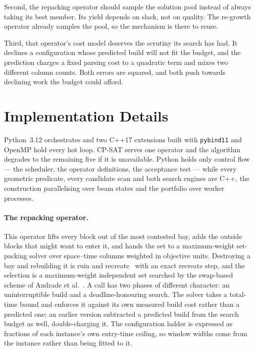 \documentclass[runningheads]{llncs}
\begin{document}
Second, the repacking operator should sample the solution pool instead of always taking its best
member. Its yield depends on slack, not on quality. The re-growth operator already samples the
pool, so the mechanism is there to reuse.

Third, that operator's cost model deserves the scrutiny its search has had. It declines a
configuration whose predicted build will not fit the budget, and the prediction charges a fixed
parsing cost to a quadratic term and mixes two different column counts. Both errors are squared,
and both push towards declining work the budget could afford.

\section{Implementation Details}
\label{sec:implementation}

Python~3.12 orchestrates and two C++17 extensions built with \texttt{pybind11} and OpenMP hold
every hot loop. CP-SAT serves one operator and the algorithm degrades to the remaining five if it
is unavailable. Python holds only control flow --- the scheduler, the operator definitions, the
acceptance test --- while every geometric predicate, every candidate scan and both search engines
are C++, the construction parallelising over beam states and the portfolio over worker processes.

\paragraph{The repacking operator.}
\label{sec:repack}
This operator lifts every block out of the most contested bay, adds the outside blocks that might
want to enter it, and hands the set to a maximum-weight set-packing solver over space--time columns
weighted in objective units. Destroying a bay and rebuilding it is ruin and
recreate~\cite{schrimpf2000} with an exact recreate step, and the selection is a maximum-weight
independent set searched by the swap-based scheme of Andrade et al.~\cite{andrade2012}. A call has
two phases of different character: an uninterruptible build and a deadline-honouring search. The
solver takes a total-time bound and enforces it against its own measured build cost rather than a
predicted one; an earlier version subtracted a predicted build from the search budget as well,
double-charging it. The configuration ladder is expressed as fractions of each instance's own
entry-time ceiling, so window widths come from the instance rather than being fitted to it.
\end{document}
